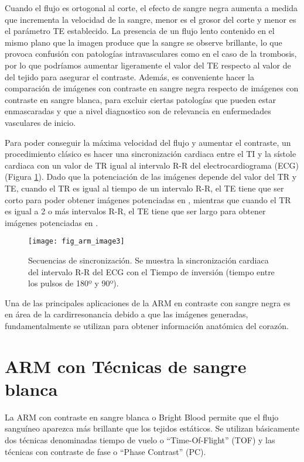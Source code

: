 Cuando el flujo es ortogonal al corte, el efecto de sangre negra aumenta a medida que incrementa la velocidad de la sangre, menor es el grosor del corte y menor es el parámetro TE establecido. La presencia de un flujo lento contenido en el mismo plano que la imagen produce que la sangre se observe brillante, lo que provoca confusión con patologías intravasculares como en el caso de la trombosis, por lo que podríamos aumentar ligeramente el valor del TE respecto al valor de \Tone del tejido para asegurar el contraste. Además, es conveniente hacer la comparación de imágenes con contraste en sangre negra respecto de imágenes con contraste en sangre blanca, para excluir ciertas patologías que pueden estar enmascaradas y que a nivel diagnostico son de relevancia en enfermedades vasculares de inicio. 

Para poder conseguir la máxima velocidad del flujo y aumentar el contraste, un procedimiento clásico es hacer una sincronización cardiaca  entre el TI y la sístole cardiaca con un valor de TR igual al intervalo R-R del electrocardiograma (ECG) (Figura \ref{fig:arm_image3}). Dado que la potenciación de las imágenes depende del valor del TR y TE, cuando el TR es igual al tiempo de un intervalo R-R, el TE tiene que ser corto para poder obtener imágenes potenciadas en \Tone, mientras que cuando el TR es igual a 2 o más intervalos R-R, el TE tiene que ser largo para obtener imágenes potenciadas en \Ttwo. 




\begin{figure}[htbp]
\begin{figg}
 \texttt{[image: fig\_arm\_image3]}
 \caption{Secuencias de sincronización.  Se muestra la sincronización cardiaca del intervalo R-R del ECG con el Tiempo de inversión (tiempo entre los pulsos de 180º y 90º). }
 \label{fig:arm_image3}
\end{figg}
\end{figure}


Una de las principales aplicaciones de la ARM en contraste con sangre negra es en área de la cardirresonancia debido a que las imágenes generadas, fundamentalmente se utilizan para obtener información anatómica del corazón.

\section{ARM con Técnicas de sangre blanca}
La ARM con contraste en sangre blanca o Bright Blood permite que el flujo sanguíneo aparezca más brillante que los tejidos estáticos. Se utilizan básicamente dos técnicas denominadas tiempo de vuelo o ``Time-Of-Flight'' (TOF) y las técnicas con contraste de fase o ``Phase Contrast'' (PC). 


